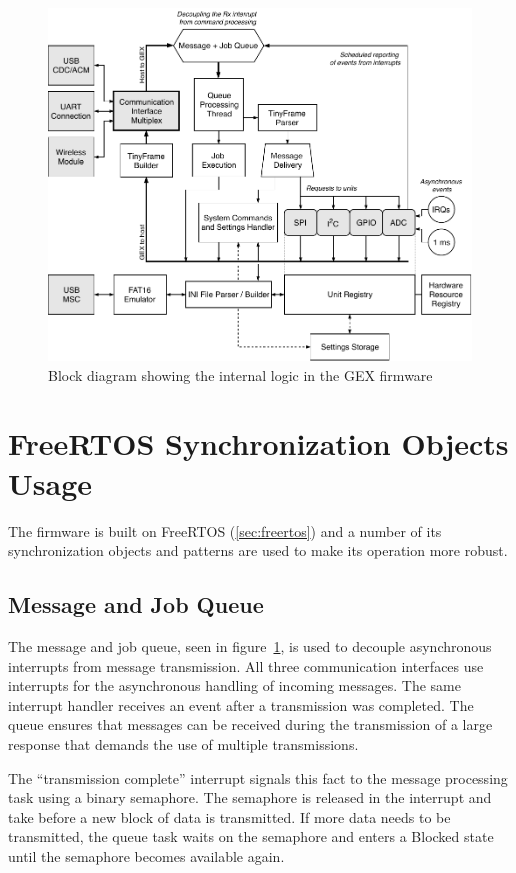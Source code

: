 \begin{figure}[h]
	\centering
	\includegraphics[scale=1] {img/gex-internal.pdf}
	\caption{\label{fig:gex-internal}Block diagram showing the internal logic in the GEX firmware}
\end{figure}

\section{FreeRTOS Synchronization Objects Usage}

The firmware is built on FreeRTOS (\ref{sec:freertos}) and a number of its synchronization objects and patterns are used to make its operation more robust.

\subsection{Message and Job Queue}

The message and job queue, seen in figure~\ref{fig:gex-internal}, is used to decouple asynchronous interrupts from message transmission. All three communication interfaces use interrupts for the asynchronous handling of incoming messages. The same interrupt handler receives an event after a transmission was completed. The queue ensures that messages can be received during the transmission of a large response that demands the use of multiple transmissions.

The ``transmission complete'' interrupt signals this fact to the message processing task using a binary semaphore. The semaphore is released in the interrupt and take before a new block of data is transmitted. If more data needs to be transmitted, the queue task waits on the semaphore and enters a Blocked state until the semaphore becomes available again.

